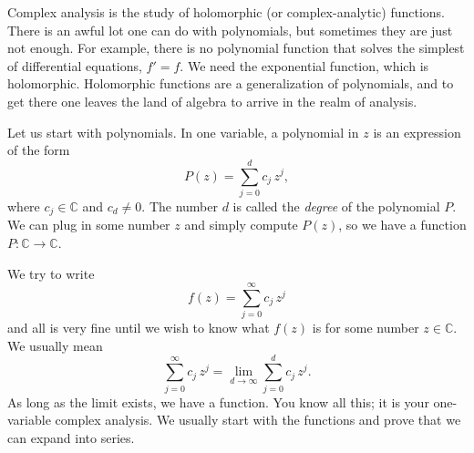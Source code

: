 \documentclass[12pt,openany]{book}
\newcommand{\C}{{\mathbb{C}}}
\theoremstyle{plain}
\theoremstyle{remark}
\theoremstyle{definition}
\theoremstyle{exercise}
\theoremstyle{example}
\begin{document}
\medskip

Complex analysis is the study of holomorphic (or complex-analytic)
functions.
There is an awful lot one can do with polynomials, but sometimes they are
just not enough.  For example, there is no polynomial function that solves
the simplest of differential equations, $f' = f$.  We need the exponential
function, which is holomorphic.  
Holomorphic functions are a generalization of polynomials,
and to get there one leaves the land of algebra to arrive in the realm of
analysis.

Let us start with polynomials.  In one variable, a polynomial in $z$ is
an expression of the form
\begin{equation*}
P(z) = \sum_{j=0}^d c_j \, z^j ,
\end{equation*}
where $c_j \in \C$ and $c_d \not= 0$.  The number $d$ is called the
\emph{degree}
of the
polynomial $P$.  We can plug in some number $z$ and simply compute
$P(z)$, so we have a function $P \colon \C \to \C$.

We try to write
\begin{equation*}
f(z) = \sum_{j=0}^\infty c_j \, z^j
\end{equation*}
and all is very fine until we wish to know what $f(z)$ is for some number
$z \in \C$.
We usually mean 
\begin{equation*}
\sum_{j=0}^\infty c_j \, z^j
=
\lim_{d\to\infty}
\sum_{j=0}^d c_j \, z^j .
\end{equation*}
As long as the limit exists, we have a function.  You know all
this; it is your one-variable complex analysis.  We usually
start with the functions and prove that we can expand into series.
\end{document}
